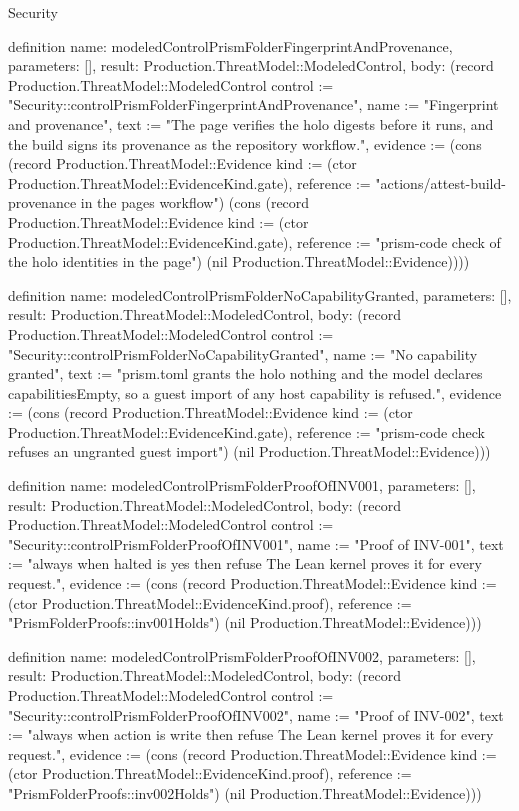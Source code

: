 \begin{lexlean}{Security}
\begin{semanticmodule}
definition{
  name: modeledControlPrismFolderFingerprintAndProvenance,
  parameters: [],
  result: Production.ThreatModel::ModeledControl,
  body: (record Production.ThreatModel::ModeledControl {control := "Security::controlPrismFolderFingerprintAndProvenance", name := "Fingerprint and provenance", text := "The page verifies the holo digests before it runs, and the build signs its provenance as the repository workflow.", evidence := (cons (record Production.ThreatModel::Evidence {kind := (ctor Production.ThreatModel::EvidenceKind.gate), reference := "actions/attest-build-provenance in the pages workflow"}) (cons (record Production.ThreatModel::Evidence {kind := (ctor Production.ThreatModel::EvidenceKind.gate), reference := "prism-code check of the holo identities in the page"}) (nil Production.ThreatModel::Evidence)))})
}

definition{
  name: modeledControlPrismFolderNoCapabilityGranted,
  parameters: [],
  result: Production.ThreatModel::ModeledControl,
  body: (record Production.ThreatModel::ModeledControl {control := "Security::controlPrismFolderNoCapabilityGranted", name := "No capability granted", text := "prism.toml grants the holo nothing and the model declares capabilitiesEmpty, so a guest import of any host capability is refused.", evidence := (cons (record Production.ThreatModel::Evidence {kind := (ctor Production.ThreatModel::EvidenceKind.gate), reference := "prism-code check refuses an ungranted guest import"}) (nil Production.ThreatModel::Evidence))})
}

definition{
  name: modeledControlPrismFolderProofOfINV001,
  parameters: [],
  result: Production.ThreatModel::ModeledControl,
  body: (record Production.ThreatModel::ModeledControl {control := "Security::controlPrismFolderProofOfINV001", name := "Proof of INV-001", text := "always when halted is yes then refuse The Lean kernel proves it for every request.", evidence := (cons (record Production.ThreatModel::Evidence {kind := (ctor Production.ThreatModel::EvidenceKind.proof), reference := "PrismFolderProofs::inv001Holds"}) (nil Production.ThreatModel::Evidence))})
}

definition{
  name: modeledControlPrismFolderProofOfINV002,
  parameters: [],
  result: Production.ThreatModel::ModeledControl,
  body: (record Production.ThreatModel::ModeledControl {control := "Security::controlPrismFolderProofOfINV002", name := "Proof of INV-002", text := "always when action is write then refuse The Lean kernel proves it for every request.", evidence := (cons (record Production.ThreatModel::Evidence {kind := (ctor Production.ThreatModel::EvidenceKind.proof), reference := "PrismFolderProofs::inv002Holds"}) (nil Production.ThreatModel::Evidence))})
}


\end{semanticmodule}
\end{lexlean}
